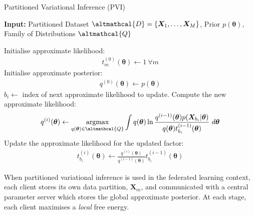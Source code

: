 \begin{algorithm}
	\caption{Partitioned Variational Inference (PVI)}
	\label{alg:PVI}
	\hspace*{\algorithmicindent} \textbf{Input:} Partitioned Dataset $\altmathcal{D} = \lbrace \bm{X}_1, \ldots, \bm{X}_M \rbrace$, Prior $p(\bm{\theta})$, Family of Distributions $\altmathcal{Q}$
	\begin{algorithmic}[1] %
		\State Initialise approximate likelihood: \begin{align}
			t_m^{(0)}(\bm{\theta}) \leftarrow 1\ \forall m 
		\end{align} 
		\State Initialise approximate posterior:
		\begin{align}
		q^{(0)}(\bm{\theta}) \leftarrow p(\bm{\theta})
		\end{align} 
		\State $b_i \leftarrow $ index of next approximate likelihood to update. 
		\State Compute the new approximate likelihood:
		\begin{align}
		q^{(i)}(\bm{\theta}) \leftarrow  \mathop{\mathrm{argmax}}_{q(\bm{\theta}) \in \altmathcal{Q}} \int q(\bm{\theta}) \ln \frac{q^{(i-1)}(\bm{\theta}) p(\bm{X}_{b_i}|\bm{\theta})}{q(\bm{\theta}) t_{b_i}^{(i-1)}(\bm{\theta})}\ d\bm{\theta} \label{eq:local_free_energy_optimisation}
		\end{align}
		\State Update the approximate likelihood for the updated factor:
		\begin{align}
		t_{b_i}^{(i)}(\bm{\theta}) \leftarrow \frac{q^{(i)}(\bm{\theta})}{q^{(i-1)}(\bm{\theta})} t_{b_i}^{(i-1)}(\bm{\theta})
		\end{align}
		\EndFor
	\end{algorithmic}
\end{algorithm}

When partitioned variational inference is used in the federated learning context, each client stores its own data partition, $\bm{X}_m$, and communicated with a central parameter server which stores the global approximate posterior. At each stage, each client maximises a \emph{local} free energy. \cite{PVI} 


